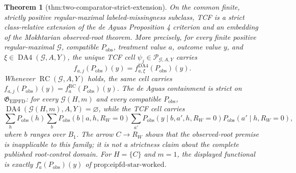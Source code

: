 \documentclass{article}
\newtheorem{theorem}{Theorem}
\begin{document}
\begin{theorem}[thm:two-comparator-strict-extension]\label{thm:two-comparator-strict-extension}
On the common finite, strictly positive regular-maximal labeled-missingness subclass, TCF is a strict class-relative extension of the de Aguas Proposition 4 criterion and an embedding of the Mokhtarian observed-root theorem. More precisely, for every finite positive regular-maximal \(\mathcal G\), compatible \(P_{\mathrm{obs}}\), treatment value \(a\), outcome value \(y\), and \(\xi\in\operatorname{DA4}(\mathcal G,A,Y)\), the unique TCF cell \(\psi_j\in\mathscr P_{\mathcal G,A,Y}\) carries \[f_{a,j}(P_{\mathrm{obs}})(y)=f^{\mathrm{DA4}}_{a,\xi}(P_{\mathrm{obs}})(y).\] Whenever \(\operatorname{RC}(\mathcal G,A,Y)\) holds, the same cell carries \(f_{a,j}(P_{\mathrm{obs}})(y)=f_a^{\mathrm{RC}}(P_{\mathrm{obs}})(y)\). The de Aguas containment is strict on \(\mathfrak G_{\mathrm{EIPFD}}\): for every \(\mathcal G(H,m)\) and every compatible \(P_{\mathrm{obs}}\), \(\operatorname{DA4}(\mathcal G(H,m),A,Y)=\varnothing\), while the TCF cell carries \[\sum_hP_{\mathrm{obs}}(h)\sum_bP_{\mathrm{obs}}(b\mid a,h,R_W=0)\sum_{a'}P_{\mathrm{obs}}(y\mid b,a',h,R_W=0)P_{\mathrm{obs}}(a'\mid h,R_W=0),\] where \(b\) ranges over \(B_1\). The arrow \(C\to R_W\) shows that the observed-root premise is inapplicable to this family; it is not a strictness claim about the complete published root-control domain. For \(H=\{C\}\) and \(m=1\), the displayed functional is exactly \(f_a^\star(P_{\mathrm{obs}})(y)\) of \(\text{prop:eipfd-star-worked}\).
\end{theorem}
\end{document}
